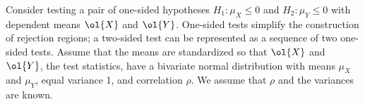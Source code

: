 \documentclass[12pt]{article}
\begin{document}
 Consider testing a pair of one-sided hypotheses $H_1: \mu_X \le 0$ and $H_2:
 \mu_Y \le 0$ with dependent means $\ol{X}$ and $\ol{Y}$.  One-sided tests
 simplify the construction of rejection regions; a two-sided test can be
 represented as a sequence of two one-sided tests.  Assume that the means are
 standardized so that $\ol{X}$ and $\ol{Y}$, the test statistics, have a
 bivariate normal distribution with means $\mu_X$ and $\mu_Y$, equal variance 1,
 and correlation $\rho$.
 We assume that $\rho$ and the variances are known.  
\end{document}
